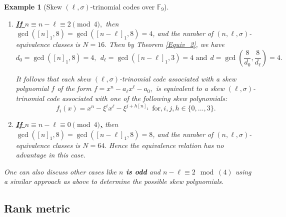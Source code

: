 \documentclass[12pt,paper]{article}
\theoremstyle{plain}
\newtheorem{example}[theorem]{Example}
\begin{document}
\begin{example} [Skew $(\ell,\sigma)$-trinomial  codes  over $\mathbb{F}_9$]
\begin{enumerate}
    


 \item  \underline{\textbf{If $n \equiv n-\ell \equiv 2 \pmod{4},$}} then $\gcd \left( [n]_1 , 8\right) =\gcd \left( [n-\ell]_1 , 8\right)= 4$, and the number of $(n,\ell,\sigma)$-equivalence classes is $ N= 16.$  Then by Theorem \ref{Equiv_2}, we have 
     $$d_0=\gcd( [n]_1, 8)= 4,\ \ d_{\ell}= \gcd( [n-\ell]_1, 3)= 4 \text{ and} \ \  d=\gcd\left( \frac{8}{d_0}, \frac{8}{d_{\ell}}\right)=4.$$

     It follows that each  skew $(\ell,\sigma)$-trinomial  code associated with a skew  polynomial $f$ of the form  $f =x^{n}- a_{\ell} x^{\ell}-a_0,$ is equivalent to a  skew $(\ell,\sigma)$-trinomial  code  associated with one of the following  skew polynomials: 
  $$f_{i}(x)= x^{n} - \xi^i x^{\ell} - \xi^{ j+h [n]_1 }  \ \ \text{for}, i,j,h\in \{0,\ldots, 3\}.  $$

\item \underline{\textbf{ If $n \equiv n-\ell \equiv 0 \pmod{4}$,}} then $\gcd \left( [n]_1 , 8\right) =\gcd \left( [n-\ell]_1 , 8\right)= 8$, and the number of $(n,\ell,\sigma)$-equivalence classes is $ N= 64.$ Hence  the equivalence relation has no advantage in this case.
\end{enumerate}
One can also discuss other cases like \textbf{ $ n$ is odd} and\textbf{ $ n-\ell\equiv 2 \mod(4)$} using a similar approach as above to determine the possible skew polynomials.
\end{example}








\subsection{Rank metric}
\end{document}

